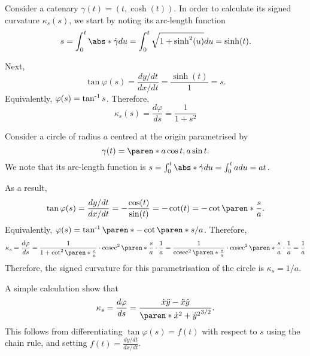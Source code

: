 \documentclass[11pt]{penrose}
\begin{document}
\begin{negg}
    Consider a catenary $\gamma(t) = (t, \cosh(t))$. In order to calculate its signed curvature $\kappa_s(s)$, we start by noting its arc-length function
    \begin{equation}
        s = \int_0^t \abs*{\dot{\gamma}} du
        = \int_0^t \sqrt{1 + \sinh^2(u)} du
        = \sinh(t).
    \end{equation}

    Next,
    \begin{equation}
        \tan\varphi(s) = \frac{dy/dt}{dx/dt}
        = \frac{\sinh(t)}{1} = s.
    \end{equation}
    Equivalently, $\varphi(s) = \operatorname{{tan}^{-1}}{s}$. Therefore,
    \begin{equation}
        \kappa_s(s) = \frac{d\varphi}{ds} = \frac{1}{1+s^2}
    \end{equation}
\end{negg}

\begin{negg}
    Consider a circle of radius $a$ centred at the origin parametrised by
    \begin{equation}
        \gamma(t) = \paren*{a \cos t, a \sin t}.
    \end{equation}
    We note that its arc-length function is $s = \int_0^t \abs*{\dot{\gamma}} du = \int_0^t a du = at$.

    As a result,
    \begin{equation}
        \tan\varphi(s) = \frac{dy/dt}{dx/dt} = -\frac{\cos(t)}{\sin(t)} = -\cot(t) = -\cot\paren*{\frac{s}{a}}.
    \end{equation}
    Equivalently, $\varphi(s) = \atan{ \paren*{-\cot\paren*{s/a}} }$. Therefore,
    \begin{align}
        \kappa_s
        = \frac{d\varphi}{ds}
        = \frac{1}{1+\cot^2\paren*{ \frac{s}{a} }} \cdot \cosec^2\paren*{ \frac{s}{a} } \cdot \frac{1}{a}
        = \frac{1}{\cosec^2\paren*{ \frac{s}{a} }} \cdot \cosec^2\paren*{ \frac{s}{a} } \cdot \frac{1}{a}
        = \frac{1}{a}
    \end{align}
    Therefore, the signed curvature for this parametrisation of the circle is $\kappa_s = 1/a$.
\end{negg}

\begin{remark}
    A simple calculation show that
    \begin{equation}
        \kappa_s = \frac{d\varphi}{ds} = \frac{\dot{x}\ddot{y} - \ddot{x}\dot{y}}{\paren*{\dot{x}^2+\dot{y}^2}^{3/2}}.
    \end{equation}
    This follows from differentiating $\tan\varphi(s) = f(t)$ with respect to $s$ using the chain rule, and setting $f(t) = \frac{dy/dt}{dx/dt}$.
\end{remark}
\end{document}
